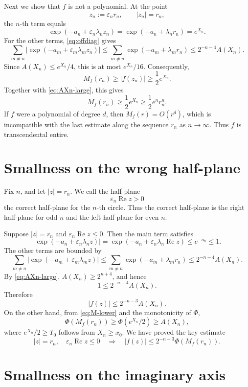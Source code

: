 \documentclass[11pt]{article}
\DeclareMathOperator{\Ree}{Re}
\begin{document}
Next we show that \(f\) is not a polynomial.  At the point
\[
z_n:=\varepsilon_n r_n,
\qquad |z_n|=r_n,
\]
the \(n\)-th term equals
\[
\exp(-a_n+\varepsilon_n\lambda_n z_n)
=
\exp(-a_n+\lambda_n r_n)
=e^{X_n}.
\]
For the other terms, \eqref{eq:offdiag} gives
\[
\sum_{m\ne n}
\left|\exp(-a_m+\varepsilon_m\lambda_m z_n)\right|
\le
\sum_{m\ne n}
\exp(-a_m+\lambda_m r_n)
\le
2^{-n-4}A(X_n).
\]
Since \(A(X_n)\le e^{X_n}/4\), this is at most \(e^{X_n}/16\).  Consequently,
\begin{equation}\label{eq:M-lower}
M_f(r_n)
\ge |f(z_n)|
\ge \frac12 e^{X_n}.
\end{equation}
Together with \eqref{eq:AXn-large}, this gives
\[
M_f(r_n)
\ge
\frac12 e^{X_n}
\ge
\frac12 e^n r_n^n.
\]
If \(f\) were a polynomial of degree \(d\), then \(M_f(r)=O(r^d)\), which is
incompatible with the last estimate along the sequence \(r_n\) as \(n\to\infty\).
Thus \(f\) is transcendental entire.

\section{Smallness on the wrong half-plane}

Fix \(n\), and let \(|z|=r_n\).  We call the half-plane
\[
\varepsilon_n\Ree z>0
\]
the correct half-plane for the \(n\)-th circle.  Thus the correct half-plane is
the right half-plane for odd \(n\) and the left half-plane for even \(n\).

Suppose \(|z|=r_n\) and \(\varepsilon_n\Ree z\le 0\).  Then the main term
satisfies
\[
\left|\exp(-a_n+\varepsilon_n\lambda_n z)\right|
=
\exp(-a_n+\varepsilon_n\lambda_n\Ree z)
\le e^{-a_n}
\le 1.
\]
The other terms are bounded by
\[
\sum_{m\ne n}
\left|\exp(-a_m+\varepsilon_m\lambda_m z)\right|
\le
\sum_{m\ne n}\exp(-a_m+\lambda_m r_n)
\le
2^{-n-4}A(X_n).
\]
By \eqref{eq:AXn-large}, \(A(X_n)\ge 2^{n+4}\), and hence
\[
1\le 2^{-n-4}A(X_n).
\]
Therefore
\[
|f(z)|
\le
2^{-n-3}A(X_n).
\]
On the other hand, from \eqref{eq:M-lower} and the monotonicity of \(\Phi\),
\[
\Phi(M_f(r_n))
\ge
\Phi(e^{X_n}/2)
\ge
A(X_n),
\]
where \(e^{X_n}/2\ge T_0\) follows from \(X_n\ge x_0\).  We have proved the key
estimate
\begin{equation}\label{eq:wrong-halfplane}
|z|=r_n,
\quad
\varepsilon_n\Ree z\le 0
\quad\Longrightarrow\quad
|f(z)|
\le
2^{-n-3}\Phi(M_f(r_n)).
\end{equation}

\section{Smallness on the imaginary axis}
\end{document}
